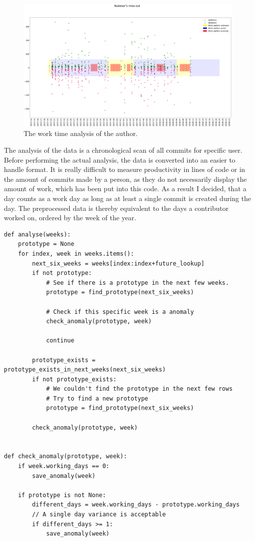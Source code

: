 \begin{figure}[H]
    \includegraphics[scale=0.20]{./graphs/analysis/work-time-analysis}
    \centering
    \caption{The work time analysis of the author.}\label{fig:missing-time}
\end{figure}

The analysis of the data is a chronological scan of all commits for specific user.
Before performing the actual analysis, the data is converted into an easier to handle format.
It is really difficult to measure productivity in lines of code or in the amount of commits made by a person, as they do not necessarily display the amount of work, which has been put into this code.
As a result I decided, that a day counts as a work day as long as at least a single commit is created during the day.
The preprocessed data is thereby equivalent to the days a contributor worked on, ordered by the week of the year.

\begin{verbatim}
def analyse(weeks):
    prototype = None
    for index, week in weeks.items():
        next_six_weeks = weeks[index:index+future_lookup]
        if not prototype:
            # See if there is a prototype in the next few weeks.
            prototype = find_prototype(next_six_weeks)

            # Check if this specific week is a anomaly
            check_anomaly(prototype, week)

            continue

        prototype_exists = prototype_exists_in_next_weeks(next_six_weeks)
        if not prototype_exists:
            # We couldn't find the prototype in the next few rows
            # Try to find a new prototype
            prototype = find_prototype(next_six_weeks)

        check_anomaly(prototype, week)


def check_anomaly(prototype, week):
    if week.working_days == 0:
        save_anomaly(week)

    if prototype is not None:
        different_days = week.working_days - prototype.working_days
        // A single day variance is acceptable
        if different_days >= 1:
            save_anomaly(week)

\end{verbatim}
\begingroup
{}\label{lst:miss-out-algorithm}
\endgroup

